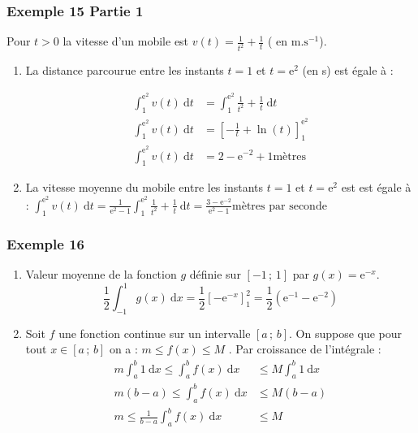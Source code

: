 \documentclass[11pt, hyperref={urlcolor=red,%
            linkcolor=blue, %
            colorlinks=true}]{beamer}
\newcommand{\Interff}[2]{\left[#1\, ;\, #2\right]}
\newcommand{\dx}{\ensuremath{\text{d}x}}		%
\newcommand{\dt}{\ensuremath{\text{d}t}}		%
\newcommand{\integralex}[3]{\int_{#1}^{#2} #3 \ \dx}
\newcommand{\integralet}[3]{\int_{#1}^{#2} #3 \ \dt}
\begin{document}
\begin{frame}
\frametitle{Exemple  15 Partie 1}
Pour $t>0$ la vitesse d'un mobile est $v(t)=\frac{1}{t^2}+\frac{1}{t}$ ( en $\text{m}.\text{s}^{-1}$).
\begin{enumerate}
\item La distance parcourue entre les instants $t=1$ et $t=\text{e}^2$ (en s) est égale à :

\begin{align*}
\integralet{1}{\text{e}^2}{v(t)} &= \integralet{1}{\text{e}^2}{\frac{1}{t^2}+\frac{1}{t}} \\
\integralet{1}{\text{e}^2}{v(t)} &= \left[-\frac{1}{t}+\ln(t)\right]_{1}^{\text{e}^2} \\
\integralet{1}{\text{e}^2}{v(t)} &= 2 -\text{e}^{-2}+1 \text{mètres}
\end{align*}


\item  La vitesse moyenne du mobile entre les instants $t=1$ et $t=\text{e}^2$ est est égale à :
$
\integralet{1}{\text{e}^2}{v(t)} = \frac{1}{\text{e}^2-1}\integralet{1}{\text{e}^2}{\frac{1}{t^2}+\frac{1}{t}}= \frac{3 -\text{e}^{-2}}{\text{e}^2-1} \text{mètres par seconde}$

\end{enumerate}
\end{frame}




\begin{frame}
\frametitle{Exemple  16}
\label{exemple16}

\begin{enumerate}
\item Valeur moyenne de la fonction  $g$ définie sur $\Interff{-1}{1}$ par \mbox{$g(x)=\text{e}^{-x}$}. 
\begin{equation*}
\frac{1}{2}\integralex{-1}{1}{g(x)} = \frac{1}{2} \left[-\text{e}^{-x}\right]_{1}^{2}= \frac{1}{2}\left(\text{e}^{-1}- \text{e}^{-2}  \right)
\end{equation*}
\item  Soit $f$ une fonction continue sur un intervalle $\Interff{a}{b}$.
On suppose que pour tout $x \in \Interff{a}{b}$ on a : $m \leqslant f(x) \leqslant M$ . Par croissance de l'intégrale :
\begin{align*}
m \integralex{a}{b}{1}  \leqslant \integralex{a}{b}{f(x)}  & \leqslant M \integralex{a}{b}{1}  \\
m (b-a) \leqslant \integralex{a}{b}{f(x)}  & \leqslant M(b-a) \\
 m \leqslant \frac{1}{b-a}\integralex{a}{b}{f(x)}  &\leqslant M
\end{align*}
\end{enumerate}
\end{frame}
\end{document}
